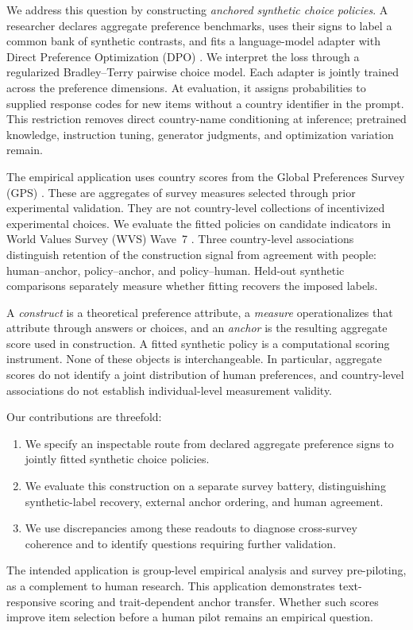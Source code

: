 We address this question by constructing \emph{anchored synthetic choice policies}. A researcher declares aggregate preference benchmarks, uses their signs to label a common bank of synthetic contrasts, and fits a language-model adapter with Direct Preference Optimization (DPO) \cite{rafailov2023}. We interpret the loss through a regularized Bradley--Terry pairwise choice model. Each adapter is jointly trained across the preference dimensions. At evaluation, it assigns probabilities to supplied response codes for new items without a country identifier in the prompt. This restriction removes direct country-name conditioning at inference; pretrained knowledge, instruction tuning, generator judgments, and optimization variation remain.

The empirical application uses country scores from the Global Preferences Survey (GPS) \cite{falk2018}. These are aggregates of survey measures selected through prior experimental validation. They are not country-level collections of incentivized experimental choices. We evaluate the fitted policies on candidate indicators in World Values Survey (WVS) Wave~7 \cite{wvs2022}. Three country-level associations distinguish retention of the construction signal from agreement with people: human--anchor, policy--anchor, and policy--human. Held-out synthetic comparisons separately measure whether fitting recovers the imposed labels.

A \emph{construct} is a theoretical preference attribute, a \emph{measure} operationalizes that attribute through answers or choices, and an \emph{anchor} is the resulting aggregate score used in construction. A fitted synthetic policy is a computational scoring instrument. None of these objects is interchangeable. In particular, aggregate scores do not identify a joint distribution of human preferences, and country-level associations do not establish individual-level measurement validity.

Our contributions are threefold:
\begin{enumerate}[leftmargin=1.5em,itemsep=2pt]
\item We specify an inspectable route from declared aggregate preference signs to jointly fitted synthetic choice policies.
\item We evaluate this construction on a separate survey battery, distinguishing synthetic-label recovery, external anchor ordering, and human agreement.
\item We use discrepancies among these readouts to diagnose cross-survey coherence and to identify questions requiring further validation.
\end{enumerate}
The intended application is group-level empirical analysis and survey pre-piloting, as a complement to human research. This application demonstrates text-responsive scoring and trait-dependent anchor transfer. Whether such scores improve item selection before a human pilot remains an empirical question.
